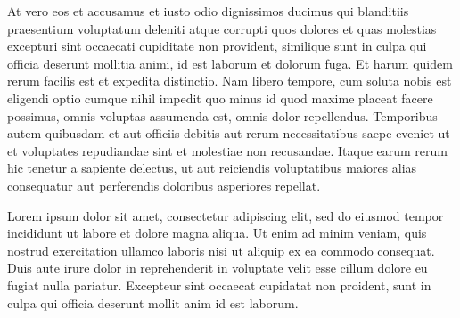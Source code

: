 \documentclass[a4paper, left=1cm, right=1cm, top=1cm, bottom=1cm,french]{article}
\begin{document}
At vero eos et accusamus et iusto odio dignissimos ducimus qui
blanditiis praesentium voluptatum deleniti atque corrupti quos dolores
et quas molestias excepturi sint occaecati cupiditate non provident,
similique sunt in culpa qui officia deserunt mollitia animi, id est
laborum et dolorum fuga. Et harum quidem rerum facilis est et expedita
distinctio. Nam libero tempore, cum soluta nobis est eligendi optio
cumque nihil impedit quo minus id quod maxime placeat facere possimus,
omnis voluptas assumenda est, omnis dolor repellendus. Temporibus autem
quibusdam et aut officiis debitis aut rerum necessitatibus saepe eveniet
ut et voluptates repudiandae sint et molestiae non recusandae. Itaque
earum rerum hic tenetur a sapiente delectus, ut aut reiciendis
voluptatibus maiores alias consequatur aut perferendis doloribus
asperiores repellat.

Lorem ipsum dolor sit amet, consectetur adipiscing elit, sed do eiusmod
tempor incididunt ut labore et dolore magna aliqua. Ut enim ad minim
veniam, quis nostrud exercitation ullamco laboris nisi ut aliquip ex ea
commodo consequat. Duis aute irure dolor in reprehenderit in voluptate
velit esse cillum dolore eu fugiat nulla pariatur. Excepteur sint
occaecat cupidatat non proident, sunt in culpa qui officia deserunt
mollit anim id est laborum.


\end{document}
